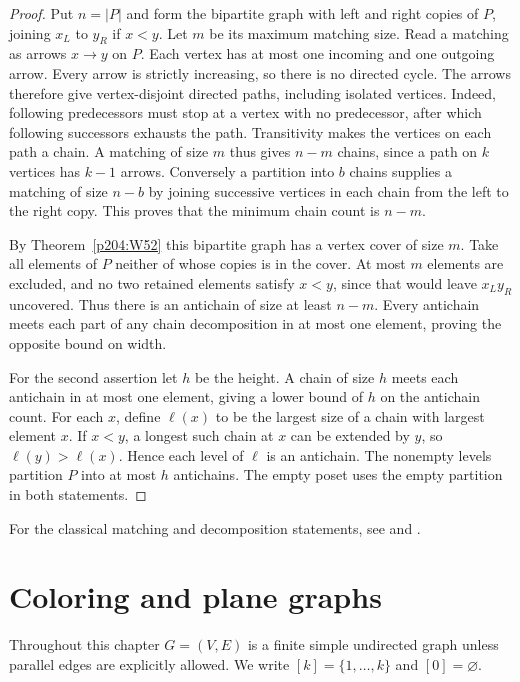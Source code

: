 \documentclass[11pt,oneside,openany]{book}
\theoremstyle{plain}
\theoremstyle{definition}
\theoremstyle{remark}
\begin{document}
\begin{proof}
Put \(n=|P|\) and form the bipartite graph with left and right
copies of \(P\), joining \(x_L\) to \(y_R\) if \(x<y\).
Let \(m\) be its maximum matching size. Read a matching as
arrows \(x\to y\) on \(P\). Each vertex has at most one incoming
and one outgoing arrow. Every arrow is strictly increasing,
so there is no directed cycle. The arrows therefore give
vertex-disjoint directed paths, including isolated vertices.
Indeed, following predecessors must stop at a vertex with no
predecessor, after which following successors exhausts the path.
Transitivity makes the vertices on each path a chain. A matching
of size \(m\) thus gives \(n-m\) chains, since a path on \(k\)
vertices has \(k-1\) arrows. Conversely a partition into \(b\)
chains supplies a matching of size \(n-b\) by joining successive
vertices in each chain from the left to the right copy. This
proves that the minimum chain count is \(n-m\).

By Theorem~\ref{p204:W52} this bipartite graph has a vertex cover
of size \(m\). Take all elements of \(P\) neither of whose copies
is in the cover. At most \(m\) elements are excluded, and no
two retained elements satisfy \(x<y\), since that would leave
\(x_Ly_R\) uncovered. Thus there is an antichain of size at least
\(n-m\). Every antichain meets each part of any chain decomposition
in at most one element, proving the opposite bound on width.

For the second assertion let \(h\) be the height. A chain of
size \(h\) meets each antichain in at most one element, giving
a lower bound of \(h\) on the antichain count. For each \(x\),
define \(\ell(x)\) to be the largest size of a chain with largest
element \(x\). If \(x<y\), a longest such chain at \(x\) can be
extended by \(y\), so \(\ell(y)>\ell(x)\). Hence each level of
\(\ell\) is an antichain. The nonempty levels partition \(P\)
into at most \(h\) antichains. The empty poset uses the empty
partition in both statements.
\end{proof}

For the classical matching and decomposition statements, see
\cite[Chapter 16]{BM} and \cite[Sections 14.2, 16.2, and 24.1]{Schrijver}.
\chapter{Coloring and plane graphs}\label{p204:ch09}

Throughout this chapter \(G=(V,E)\) is a finite simple undirected
graph unless parallel edges are explicitly allowed. We write
\([k]=\{1,\ldots,k\}\) and \([0]=\varnothing\).
\end{document}
